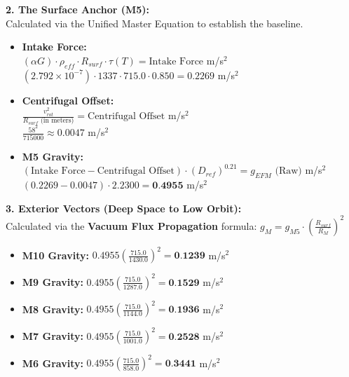 \documentclass[11pt, a4paper]{article}
\begin{document}
  \vspace{1.0em}
  \noindent \textbf{2. The Surface Anchor (M5):} \\
  \hspace*{1em} Calculated via the Unified Master Equation to establish the baseline.
  \begin{itemize}
    \item \textbf{Intake Force:} \\[0.5em]
    \hspace*{2em} $(\alpha G) \cdot \rho_{eff} \cdot R_{surf} \cdot \tau(T) = \text{Intake Force}$ m/s$^2$ \\[1em]
    \hspace*{2em} $(2.792 \times 10^{-7}) \cdot 1337 \cdot 715.0 \cdot 0.850 = 0.2269$ m/s$^2$
    
    \item \textbf{Centrifugal Offset:} \\[0.5em]
    \hspace*{2em} $\frac{v_{rot}^2}{R_{surf} \text{ (in meters)}} = \text{Centrifugal Offset}$ m/s$^2$ \\[1em]
    \hspace*{2em} $\frac{58^2}{715000} \approx 0.0047$ m/s$^2$
    
    \item \textbf{M5 Gravity:} \\[0.5em]
    \hspace*{2em} $(\text{Intake Force} - \text{Centrifugal Offset}) \cdot (D_{ref})^{0.21} = g_{EFM} \text{ (Raw)}$ m/s$^2$ \\[1em]
    \hspace*{2em} $(0.2269 - 0.0047) \cdot 2.2300 = \textbf{0.4955}$ m/s$^2$
  \end{itemize}

  \clearpage
  \noindent \textbf{3. Exterior Vectors (Deep Space to Low Orbit):} \\
  \hspace*{1em} Calculated via the \textbf{Vacuum Flux Propagation} formula: $g_M = g_{M5} \cdot \left( \frac{R_{surf}}{R_M} \right)^2$
  \begin{itemize}
    \item \textbf{M10 Gravity:} $0.4955 \left( \frac{715.0}{1430.0} \right)^2 = \textbf{0.1239}$ m/s$^2$
    \item \textbf{M9 Gravity:} $0.4955 \left( \frac{715.0}{1287.0} \right)^2 = \textbf{0.1529}$ m/s$^2$
    \item \textbf{M8 Gravity:} $0.4955 \left( \frac{715.0}{1144.0} \right)^2 = \textbf{0.1936}$ m/s$^2$
    \item \textbf{M7 Gravity:} $0.4955 \left( \frac{715.0}{1001.0} \right)^2 = \textbf{0.2528}$ m/s$^2$
    \item \textbf{M6 Gravity:} $0.4955 \left( \frac{715.0}{858.0} \right)^2 = \textbf{0.3441}$ m/s$^2$
  \end{itemize}
\end{document}
